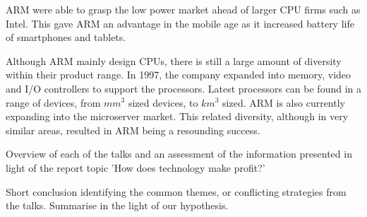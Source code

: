 ARM were able to grasp the low power market ahead of larger CPU firms such as Intel. 
This gave ARM an advantage in the mobile age as it increased battery life of smartphones and tablets.

Although ARM mainly design CPUs, there is still a large amount of diversity within their product range.
In 1997, the company expanded into memory, video and I/O controllers to support the processors.
Latest processors can be found in a range of devices, from $mm^{3}$ sized devices, to $km^{3}$ sized. 
ARM is also currently expanding into the microserver market.
This related diversity, although in very similar areas, resulted in ARM being a resounding success.


Overview of each of the talks and an assessment of the information presented in light of the report topic 'How does technology make profit?' 

Short conclusion identifying the common themes, or conflicting strategies from the talks.
Summarise in the light of our hypothesis.



